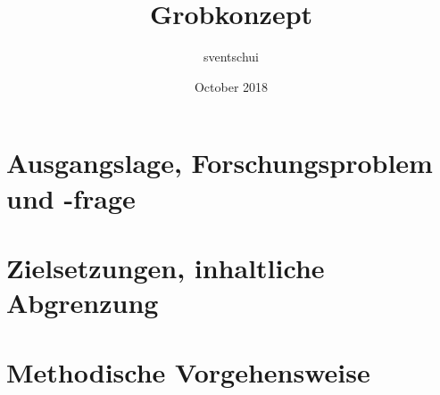 \documentclass{article}
\title{Grobkonzept}
\author{sventschui }
\date{October 2018}
\begin{document}
\maketitle


\section{Ausgangslage, Forschungsproblem und -frage}


\section{Zielsetzungen, inhaltliche Abgrenzung}



\section{Methodische Vorgehensweise}

 
\end{document}
